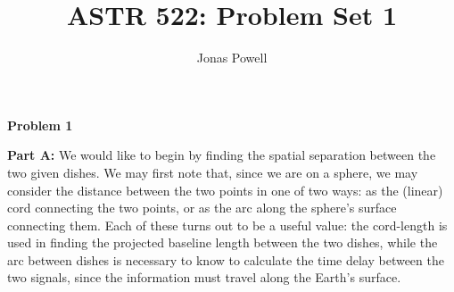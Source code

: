 \documentclass[12pt]{article}
\begin{document}
\title{\textbf{ASTR 522: Problem Set 1}}
\author{Jonas Powell}
\maketitle


\begin{onehalfspacing}

\raggedright{\textbf{\Large Problem 1}}\\
\bigskip
\bigskip
\raggedright{\textbf{\large Part A: }}
We would like to begin by finding the spatial separation between the two given dishes. We may first note that, since we are on a sphere, we may consider the distance between the two points in one of two ways: as the (linear) cord connecting the two points, or as the arc along the sphere's surface connecting them. Each of these turns out to be a useful value: the cord-length is used in finding the projected baseline length between the two dishes, while the arc between dishes is necessary to know to calculate the time delay between the two signals, since the information must travel along the Earth's surface.


\end{onehalfspacing}
\end{document}
